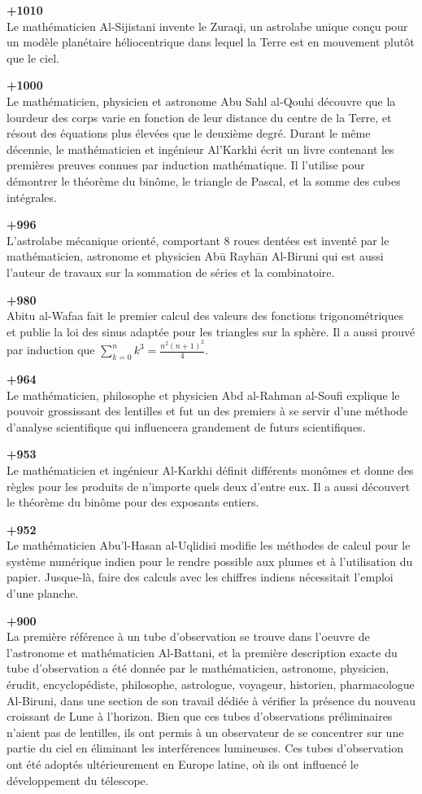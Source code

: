 \textbf{+1010}\\
Le mathématicien Al-Sijistani invente le Zuraqi, un astrolabe unique conçu pour un modèle planétaire héliocentrique dans lequel la Terre est en mouvement plutôt que le ciel.

\textbf{+1000}\\
Le mathématicien, physicien et astronome Abu Sahl al-Qouhi découvre que la lourdeur des corps varie en fonction de leur distance du centre de la Terre, et résout des équations plus élevées que le deuxième degré. Durant le même décennie, le mathématicien et ingénieur Al'Karkhi écrit un livre contenant les premières preuves connues par induction mathématique. Il l'utilise pour démontrer le théorème du binôme, le triangle de Pascal, et la somme des cubes intégrales.

\textbf{+996}\\
L'astrolabe mécanique orienté, comportant 8 roues dentées est inventé par le mathématicien, astronome et physicien Abū Rayhān Al-Biruni qui est aussi l'auteur de travaux sur la sommation de séries et la combinatoire.

\textbf{+980}\\
Abitu al-Wafaa fait le premier calcul des valeurs des fonctions trigonométriques et publie la loi des sinus adaptée pour les triangles sur la sphère. Il a aussi prouvé par induction que $\sum_{k=0}^n k^3=\frac{n^2(n+1)^2}{4}$.

\textbf{+964}\\
Le mathématicien, philosophe et physicien Abd al-Rahman al-Soufi explique le pouvoir grossissant des lentilles et fut un des premiers à se servir d'une méthode d'analyse scientifique qui influencera grandement de futurs scientifiques.

\textbf{+953}\\
Le mathématicien et ingénieur Al-Karkhi définit différents monômes et donne des règles pour les produits de n'importe quels deux d'entre eux. Il a aussi découvert le théorème du binôme pour des exposants entiers.

\textbf{+952}\\
Le mathématicien Abu'l-Hasan al-Uqlidisi modifie les méthodes de calcul pour le système numérique indien pour le rendre possible aux plumes et à l'utilisation du papier. Jusque-là, faire des calculs avec les chiffres indiens nécessitait l'emploi d'une planche.

\textbf{+900}\\
La première référence à un tube d'observation se trouve dans l'oeuvre de l'astronome et mathématicien Al-Battani, et la première description exacte du tube d'observation a été donnée par le mathématicien, astronome, physicien, érudit, encyclopédiste, philosophe, astrologue, voyageur, historien, pharmacologue Al-Biruni, dans une section de son travail  dédiée à vérifier la présence du nouveau croissant de Lune à l'horizon. Bien que ces tubes d'observations préliminaires n'aient pas de lentilles, ils ont permis à un observateur de se concentrer sur une partie du ciel en éliminant les interférences lumineuses. Ces tubes d'observation ont été adoptés ultérieurement en Europe latine, où ils ont influencé le développement du télescope.

